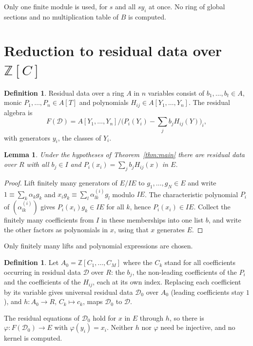 \documentclass[11pt]{amsart}
\numberwithin{equation}{section}
\newtheorem{lemma}[theorem]{Lemma}
\theoremstyle{definition}
\newtheorem{definition}[theorem]{Definition}
\theoremstyle{remark}
\newcommand{\ZZ}{\mathbb Z}
\begin{document}
Only one finite module is used, for $s$ and all $sy_i$ at once. No
ring of global sections and no multiplication table of $B$ is
computed.

\section{Reduction to residual data over \texorpdfstring{$\ZZ[C]$}{Z[C]}}\label{sec:descent}

\begin{definition}
Residual data over a ring $A$ in $n$ variables consist of
$b_1,\ldots,b_t\in A$, monic $P_1,\ldots,P_n\in A[T]$ and polynomials
$H_{ij}\in A[Y_1,\ldots,Y_n]$. The residual algebra is
\[
 F(\mathcal D)=A[Y_1,\ldots,Y_n]\big/\bigl(P_i(Y_i)-\textstyle\sum_jb_jH_{ij}(Y)\bigr)_{i},
\]
with generators $y_i$, the classes of $Y_i$.
\end{definition}

\begin{lemma}\label{lem:residual}
Under the hypotheses of Theorem~\ref{thm:main} there are residual
data over $R$ with all $b_j\in I$ and $P_i(x_i)=\sum_jb_jH_{ij}(x)$
in $E$.
\end{lemma}
\begin{proof}
Lift finitely many generators of $E/IE$ to $g_1,\ldots,g_N\in E$ and
write $1\equiv\sum_k\alpha_kg_k$ and $x_ig_k\equiv\sum_l\alpha^{(i)}_{lk}g_l$
modulo $IE$. The characteristic polynomial $P_i$ of
$(\alpha^{(i)}_{lk})$ gives $P_i(x_i)g_k\in IE$ for all $k$, hence
$P_i(x_i)\in IE$. Collect the finitely many coefficients from $I$ in
these memberships into one list $b$, and write the other factors as
polynomials in $x$, using that $x$ generates $E$.
\end{proof}

Only finitely many lifts and polynomial expressions are chosen.

\begin{definition}
Let $A_0=\ZZ[C_1,\ldots,C_M]$ where the $C_k$ stand for all
coefficients occurring in residual data $\mathcal D$ over $R$: the
$b_j$, the non-leading coefficients of the $P_i$ and the coefficients
of the $H_{ij}$, each at its own index. Replacing each coefficient by its
variable gives universal residual data $\mathcal D_0$ over $A_0$
(leading coefficients stay $1$), and $h:A_0\to R$, $C_k\mapsto c_k$,
maps $\mathcal D_0$ to $\mathcal D$.
\end{definition}

The residual equations of $\mathcal D_0$ hold for $x$ in $E$ through
$h$, so there is $\varphi:F(\mathcal D_0)\to E$ with $\varphi(y_i)=x_i$.
Neither $h$ nor $\varphi$ need be injective, and no kernel is computed.
\end{document}
